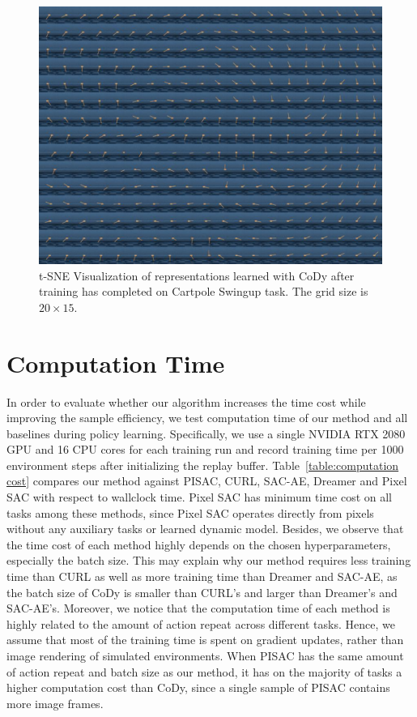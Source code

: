 \documentclass[a4paper,12pt]{article}
\begin{document}
\begin{figure}
\centering
\includegraphics[width=\textwidth]{vis/vis-cartpole-2021-10-25.pdf}
\caption{t-SNE Visualization of representations learned with CoDy after training has completed on Cartpole Swingup task. The grid size is $20 \times 15$.}
\label{vis:cartpole}
\end{figure}

\section{Computation Time}
In order to evaluate whether our algorithm increases the time cost while improving the sample efficiency, we test computation time of our method and all baselines during policy learning. Specifically, we use a single NVIDIA RTX 2080 GPU and 16 CPU cores for each training run and record training time per 1000 environment steps after initializing the replay buffer. Table~\ref{table:computation cost} compares our method against PISAC, CURL, SAC-AE, Dreamer and Pixel SAC with respect to wallclock time. Pixel SAC has minimum time cost on all tasks among these methods, since Pixel SAC operates directly from pixels without any auxiliary tasks or learned dynamic model. Besides, we observe that the time cost of each method highly depends on the chosen hyperparameters, especially the batch size. This may explain why our method requires less training time than CURL as well as more training time than Dreamer and SAC-AE, as the batch size of CoDy is smaller than CURL's and larger than Dreamer's and SAC-AE's. Moreover, we notice that the computation time of each method is highly related to the amount of action repeat across different tasks. Hence, we assume that most of the training time is spent on gradient updates, rather than image rendering of simulated environments. When PISAC has the same amount of action repeat and batch size as our method, it has on the majority of tasks a higher computation cost than CoDy, since a single sample of PISAC contains more image frames. 
\end{document}
